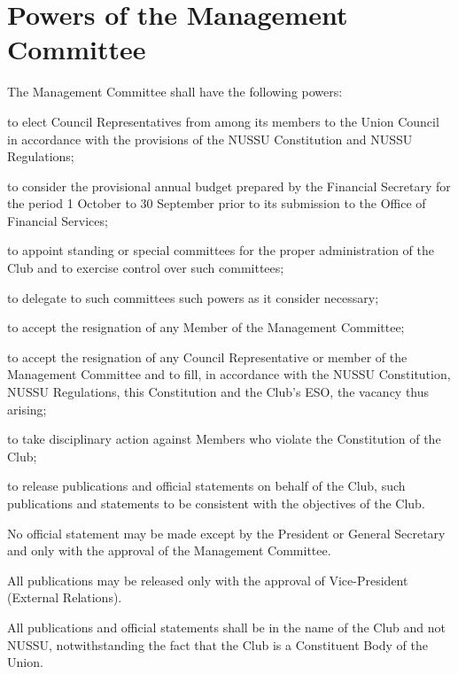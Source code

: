 \section{Powers of the Management Committee}
The Management Committee shall have the following powers:
	\begin{legal}
	\item to elect Council Representatives from among its members to the Union Council in accordance with the provisions of the NUSSU Constitution and NUSSU Regulations;
	\item to consider the provisional annual budget prepared by the Financial Secretary for the period 1 October to 30 September prior to its submission to the Office of Financial Services;
	\item to appoint standing or special committees for the proper administration of the Club and to exercise control over such committees;
		\begin{legal}
		\item to delegate to such committees such powers as it consider necessary;
		\end{legal}
	\item to accept the resignation of any Member of the Management Committee;
		\begin{legal}
		\item to accept the resignation of any Council Representative or member of the Management Committee and to fill, in accordance with the NUSSU Constitution, NUSSU Regulations, this Constitution and the Club's ESO, the vacancy thus arising;
		\end{legal}
	\item to take disciplinary action against Members who violate the Constitution of the Club;
	\item to release publications and official statements on behalf of the Club, such publications and statements to be consistent with the objectives of the Club.
		\begin{legal}
		\item No official statement may be made except by the President or General Secretary and only with the approval of the Management Committee.
		\item All publications may be released only with the approval of Vice-President (External Relations).
		\item All publications and official statements shall be in the name of the Club and not NUSSU, notwithstanding the fact that the Club is a Constituent Body of the Union.
		\end{legal}

\end{legal}

